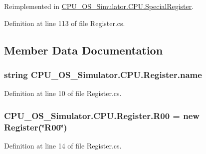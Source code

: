 Reimplemented in \hyperlink{class_c_p_u___o_s___simulator_1_1_c_p_u_1_1_special_register_a51c055fcb455a2c3904a66fb08275a58}{C\+P\+U\+\_\+\+O\+S\+\_\+\+Simulator.\+C\+P\+U.\+Special\+Register}.



Definition at line 113 of file Register.\+cs.



\subsection{Member Data Documentation}
\hypertarget{class_c_p_u___o_s___simulator_1_1_c_p_u_1_1_register_a1d9405f19dc212f0ff3d3307469451db}{}
\subsubsection[{name}]{\setlength{\rightskip}{0pt plus 5cm}string C\+P\+U\+\_\+\+O\+S\+\_\+\+Simulator.\+C\+P\+U.\+Register.\+name\hspace{0.3cm}{\ttfamily [private]}}\label{class_c_p_u___o_s___simulator_1_1_c_p_u_1_1_register_a1d9405f19dc212f0ff3d3307469451db}


Definition at line 10 of file Register.\+cs.

\hypertarget{class_c_p_u___o_s___simulator_1_1_c_p_u_1_1_register_a14dd660fd5c709aa90298e0716d8b88a}{}
\subsubsection[{R00}]{ C\+P\+U\+\_\+\+O\+S\+\_\+\+Simulator.\+C\+P\+U.\+Register.\+R00 = new {\bf Register}(\char`\"{}R00\char`\"{})\hspace{0.3cm}{\ttfamily [static]}}\label{class_c_p_u___o_s___simulator_1_1_c_p_u_1_1_register_a14dd660fd5c709aa90298e0716d8b88a}


Definition at line 14 of file Register.\+cs.

